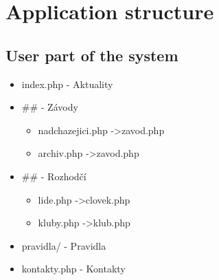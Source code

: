 \section{Application structure}
\subsection*{User part of the system}
\begin{itemize}
    \item index.php - Aktuality
    \item \#\# - Závody
    \begin{itemize}
        \item nadchazejici.php -\textgreater zavod.php
        \item archiv.php -\textgreater zavod.php
    \end{itemize} 
    \item \#\# - Rozhodčí
    \begin{itemize}
        \item lide.php -\textgreater clovek.php
        \item kluby.php -\textgreater klub.php
    \end{itemize} 
    \item pravidla/ - Pravidla   
    \item kontakty.php - Kontakty
\end{itemize}
